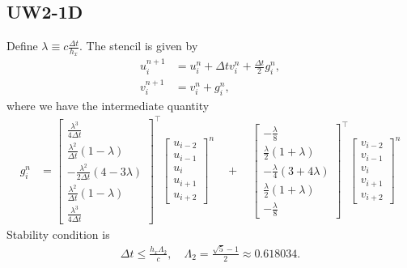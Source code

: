 \documentclass[12pt]{article}
\begin{document}



\subsection{UW2-1D}
Define $\lambda \equiv c \tfrac{\Delta t}{h_x}$.
The stencil \cite[eq. (57) \& (56)]{Banks2012} is given by
\begin{align}
u_{i}^{n+1} 
&= 
u_{i} ^n  + \Delta t v_{i}^n +  \tfrac{\Delta t}{2} g_{i} ^n,
\\
v_{i}^{n+1} 
&= 
v_{i} ^n + g_{i}^n,
\end{align}
where we have the intermediate quantity
\begin{align}
g_{i}^{n} 
&= 
\begin{bmatrix}
\tfrac{\lambda^3}{4 \Delta t} \\
\tfrac{\lambda^2}{\Delta t} (1 - \lambda) \\ 
- \tfrac{\lambda^2}{2 \Delta t} (4 - 3 \lambda) \\
\tfrac{\lambda^2}{\Delta t} (1 - \lambda) \\
\tfrac{\lambda^3}{4 \Delta t} 
\end{bmatrix}^\top
\begin{bmatrix}
u_{i-2} \\
u_{i-1} \\
u_i  \\
u_{i+1} \\
u_{i+2}
\end{bmatrix}^n 
\quad 
+ 
\quad
\begin{bmatrix}
-\tfrac{\lambda}{8} \\
\tfrac{\lambda}{2} (1 + \lambda) \\ 
-\tfrac{\lambda}{4} (3 +4 \lambda) \\ 
\tfrac{\lambda}{2} (1 + \lambda) \\
-\tfrac{\lambda}{8} 
\end{bmatrix}^\top
\begin{bmatrix}
v_{i-2} \\
v_{i-1} \\
v_i  \\
v_{i+1} \\
v_{i+2}
\end{bmatrix}^n 
\end{align}
Stability condition is \cite[eq. (63)]{Banks2012}
\begin{align}
\Delta t \leq  \frac{h_x \Lambda_2}{c}, \quad \Lambda_2 =  \frac{\sqrt{5} - 1}{2} \approx 0.618034 .
\end{align}
\end{document}
